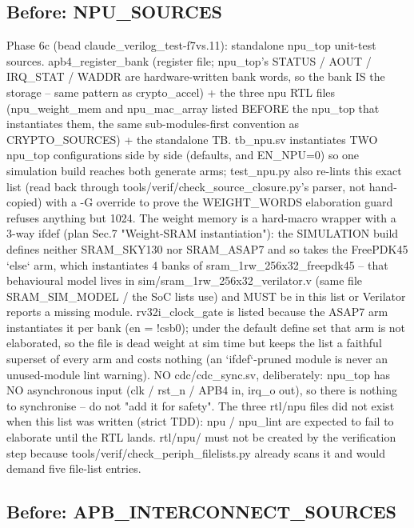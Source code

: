 \begin{record}
\subsection*{Before: NPU\_SOURCES}

\begin{textblock}
Phase 6c (bead claude_verilog_test-f7vs.11): standalone npu_top unit-test sources.
apb4_register_bank (register file; npu_top's STATUS / AOUT / IRQ_STAT / WADDR are hardware-written
bank words, so the bank IS the storage -- same pattern as crypto_accel) + the three npu RTL files
(npu_weight_mem and npu_mac_array listed BEFORE the npu_top that instantiates them, the same
sub-modules-first convention as CRYPTO_SOURCES) + the standalone TB. tb_npu.sv instantiates TWO
npu_top configurations side by side (defaults, and EN_NPU=0) so one simulation build reaches both
generate arms; test_npu.py also re-lints this exact list (read back through
tools/verif/check_source_closure.py's parser, not hand-copied) with a -G override to prove the
WEIGHT_WORDS elaboration guard refuses anything but 1024.
The weight memory is a hard-macro wrapper with a 3-way ifdef (plan Sec.7 "Weight-SRAM
instantiation"): the SIMULATION build defines neither SRAM_SKY130 nor SRAM_ASAP7 and so takes the
FreePDK45 `else` arm, which instantiates 4 banks of sram_1rw_256x32_freepdk45 -- that behavioural
model lives in sim/sram_1rw_256x32_verilator.v (same file SRAM_SIM_MODEL / the SoC lists use) and
MUST be in this list or Verilator reports a missing module. rv32i_clock_gate is listed because the
ASAP7 arm instantiates it per bank (en = !csb0); under the default define set that arm is not
elaborated, so the file is dead weight at sim time but keeps the list a faithful superset of every
arm and costs nothing (an `ifdef`-pruned module is never an unused-module lint warning).
NO cdc/cdc_sync.sv, deliberately: npu_top has NO asynchronous input (clk / rst_n / APB4 in,
irq_o out), so there is nothing to synchronise -- do not "add it for safety". The three rtl/npu
files did not exist when this list was written (strict TDD): npu / npu_lint are expected to fail
to elaborate until the RTL lands. rtl/npu/ must not be created by the verification step because
tools/verif/check_periph_filelists.py already scans it and would demand five file-list entries.
\end{textblock}

\subsection*{Before: APB\_INTERCONNECT\_SOURCES}


\end{record}
